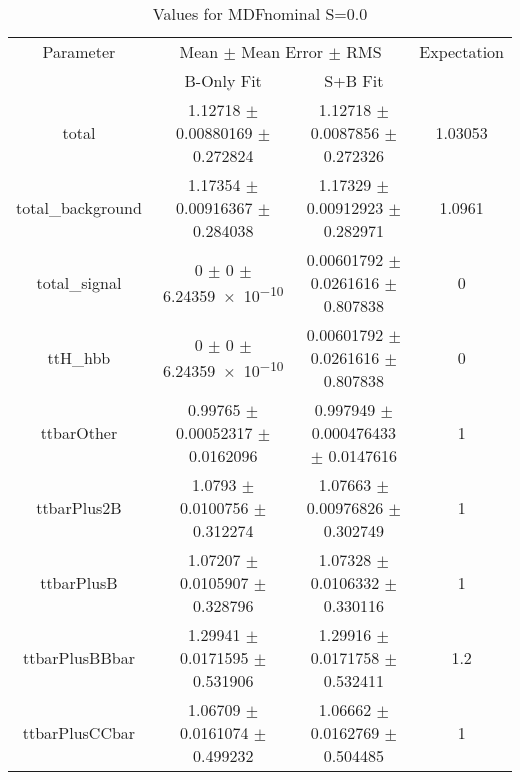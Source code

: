 \begin{table}
\centering
\caption{Values for MDFnominal S=0.0}
\begin{tabular}{cccc}
\toprule
Parameter & \multicolumn{2}{c}{Mean $\pm$ Mean Error $\pm$ RMS} & Expectation\\
 & B-Only Fit & S+B Fit & \\
\midrule
total & \num{1.12718} $\pm$ \num{0.00880169} $\pm$ \num{0.272824} & \num{1.12718} $\pm$ \num{0.0087856} $\pm$ \num{0.272326} & \num{1.03053}\\
total\_background & \num{1.17354} $\pm$ \num{0.00916367} $\pm$ \num{0.284038} & \num{1.17329} $\pm$ \num{0.00912923} $\pm$ \num{0.282971} & \num{1.0961}\\
total\_signal & \num{0} $\pm$ \num{0} $\pm$ \num{6.24359e-10} & \num{0.00601792} $\pm$ \num{0.0261616} $\pm$ \num{0.807838} & \num{0}\\
ttH\_hbb & \num{0} $\pm$ \num{0} $\pm$ \num{6.24359e-10} & \num{0.00601792} $\pm$ \num{0.0261616} $\pm$ \num{0.807838} & \num{0}\\
ttbarOther & \num{0.99765} $\pm$ \num{0.00052317} $\pm$ \num{0.0162096} & \num{0.997949} $\pm$ \num{0.000476433} $\pm$ \num{0.0147616} & \num{1}\\
ttbarPlus2B & \num{1.0793} $\pm$ \num{0.0100756} $\pm$ \num{0.312274} & \num{1.07663} $\pm$ \num{0.00976826} $\pm$ \num{0.302749} & \num{1}\\
ttbarPlusB & \num{1.07207} $\pm$ \num{0.0105907} $\pm$ \num{0.328796} & \num{1.07328} $\pm$ \num{0.0106332} $\pm$ \num{0.330116} & \num{1}\\
ttbarPlusBBbar & \num{1.29941} $\pm$ \num{0.0171595} $\pm$ \num{0.531906} & \num{1.29916} $\pm$ \num{0.0171758} $\pm$ \num{0.532411} & \num{1.2}\\
ttbarPlusCCbar & \num{1.06709} $\pm$ \num{0.0161074} $\pm$ \num{0.499232} & \num{1.06662} $\pm$ \num{0.0162769} $\pm$ \num{0.504485} & \num{1}\\
\bottomrule
\end{tabular}
\end{table}